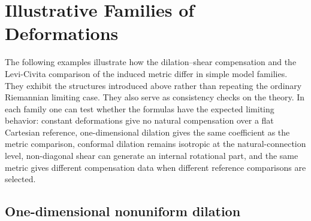 \documentclass[12pt]{amsart}
\theoremstyle{definition}
\theoremstyle{remark}
\begin{document}
\section{Illustrative Families of Deformations}\label{sec:examples}

The following examples illustrate how the dilation--shear compensation and the Levi-Civita comparison of the induced metric differ in simple model families.  They exhibit the structures introduced above rather than repeating the ordinary Riemannian limiting case.  They also serve as consistency checks on the theory.  In each family one can test whether the formulas have the expected limiting behavior: constant deformations give no natural compensation over a flat Cartesian reference, one-dimensional dilation gives the same coefficient as the metric comparison, conformal dilation remains isotropic at the natural-connection level, non-diagonal shear can generate an internal rotational part, and the same metric gives different compensation data when different reference comparisons are selected.

\subsection{One-dimensional nonuniform dilation}
\end{document}
